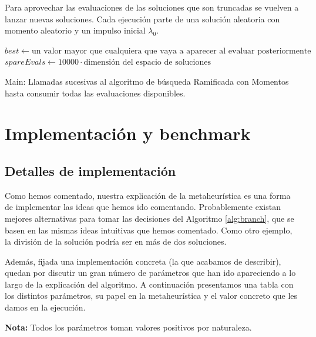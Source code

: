 \documentclass{article}
\begin{document}
Para aprovechar las evaluaciones de las soluciones que son truncadas se vuelven a lanzar nuevas soluciones.
Cada ejecución parte de una solución aleatoria con momento aleatorio y un impulso inicial $\lambda_0$.

\begin{algorithm}[H]
	\DontPrintSemicolon %
	$best\gets\text{un valor mayor que cualquiera que vaya a aparecer al evaluar posteriormente}$\;
	$spareEvals\gets 10000\cdot\text{dimensión del espacio de soluciones}$\;
	\caption{{\sc Main:} Llamadas sucesivas al algoritmo de búsqueda Ramificada con Momentos hasta consumir todas las evaluaciones
		disponibles.}
	\label{alg:main}
\end{algorithm}

\section{Implementación y benchmark}

\subsection{Detalles de implementación}

Como hemos comentado, nuestra explicación de la metaheurística es una forma de implementar las ideas que hemos ido comentando.
Probablemente existan mejores alternativas para tomar las decisiones del Algoritmo \ref{alg:branch}, que se basen en las mismas
ideas intuitivas que hemos comentado. Como otro ejemplo, la división de la solución podría ser en más de dos soluciones.

Además, fijada una implementación concreta (la que acabamos de describir), quedan por discutir un gran número de parámetros
que han ido apareciendo a lo largo de la explicación del algoritmo. A continuación presentamos una tabla con los distintos
parámetros, su papel en la metaheurística y el valor concreto que les damos en la ejecución.

\textbf{Nota:} Todos los parámetros toman valores positivos por naturaleza.
\end{document}
